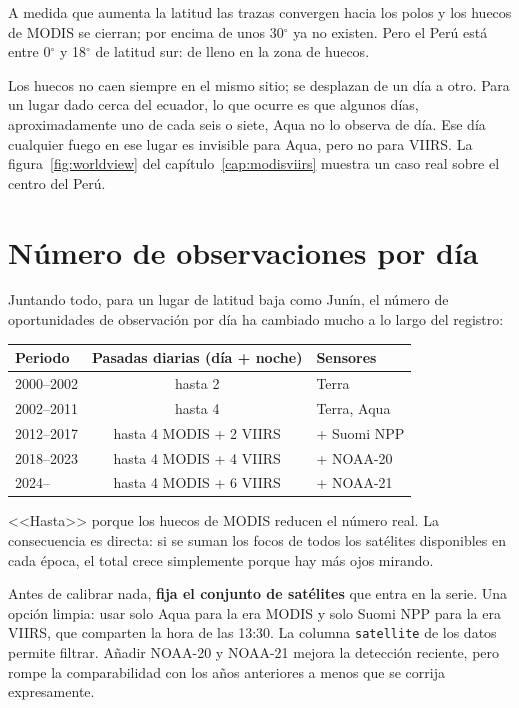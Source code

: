A medida que aumenta la latitud las trazas convergen hacia los polos y los huecos de MODIS se
cierran; por encima de unos 30$^\circ$ ya no existen. Pero el Perú está entre 0$^\circ$ y
18$^\circ$ de latitud sur: de lleno en la zona de huecos.

\begin{intuicion}
Los huecos no caen siempre en el mismo sitio; se desplazan de un día a otro. Para un lugar dado
cerca del ecuador, lo que ocurre es que algunos días, aproximadamente uno de cada seis o siete,
Aqua no lo observa de día. Ese día cualquier fuego en ese lugar es invisible para Aqua, pero no
para VIIRS. La figura~\ref{fig:worldview} del capítulo~\ref{cap:modisviirs} muestra un caso
real sobre el centro del Perú.
\end{intuicion}

\section{Número de observaciones por día}

Juntando todo, para un lugar de latitud baja como Junín, el número de oportunidades de
observación por día ha cambiado mucho a lo largo del registro:

\begin{center}
\begin{tabular}{lcl}
\toprule
Periodo & Pasadas diarias (día + noche) & Sensores \\
\midrule
2000--2002 & hasta 2 & Terra \\
2002--2011 & hasta 4 & Terra, Aqua \\
2012--2017 & hasta 4 MODIS + 2 VIIRS & + Suomi NPP \\
2018--2023 & hasta 4 MODIS + 4 VIIRS & + NOAA-20 \\
2024-- & hasta 4 MODIS + 6 VIIRS & + NOAA-21 \\
\bottomrule
\end{tabular}
\end{center}

<<Hasta>> porque los huecos de MODIS reducen el número real. La consecuencia es directa: si se
suman los focos de todos los satélites disponibles en cada época, el total crece simplemente
porque hay más ojos mirando.

\begin{parareto}
Antes de calibrar nada, \textbf{fija el conjunto de satélites} que entra en la serie. Una opción
limpia: usar solo Aqua para la era MODIS y solo Suomi NPP para la era VIIRS, que comparten la
hora de las 13:30. La columna \texttt{satellite} de los datos permite filtrar. Añadir NOAA-20 y
NOAA-21 mejora la detección reciente, pero rompe la comparabilidad con los años anteriores a
menos que se corrija expresamente.
\end{parareto}

